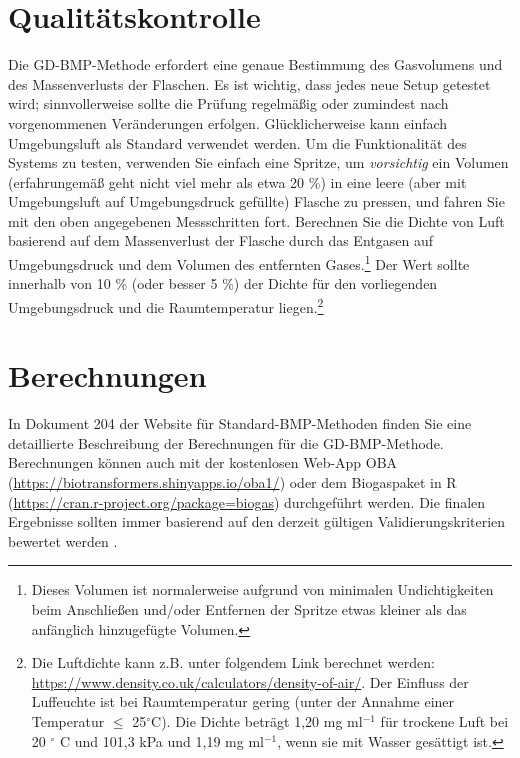 \documentclass[]{article}
\begin{document}
\section{Qualitätskontrolle}
Die GD-BMP-Methode erfordert eine genaue Bestimmung des Gasvolumens und des Massenverlusts der Flaschen.
Es ist wichtig, dass jedes neue Setup getestet wird; sinnvollerweise sollte die Prüfung regelmäßig oder zumindest nach vorgenommenen Veränderungen erfolgen.
Glücklicherweise kann einfach Umgebungsluft als Standard verwendet werden.
Um die Funktionalität des Systems zu testen, verwenden Sie einfach eine Spritze, um \textit{vorsichtig} ein Volumen (erfahrungemäß geht nicht viel mehr als etwa 20 \%) in eine leere (aber mit Umgebungsluft auf Umgebungsdruck gefüllte) Flasche zu pressen, und fahren Sie mit den oben angegebenen Messschritten fort.
Berechnen Sie die Dichte von Luft basierend auf dem Massenverlust der Flasche durch das Entgasen auf Umgebungsdruck und dem Volumen des entfernten Gases.\footnote{Dieses Volumen ist normalerweise aufgrund von minimalen Undichtigkeiten beim Anschließen und/oder Entfernen der Spritze etwas kleiner als das anfänglich hinzugefügte Volumen.}
Der Wert sollte innerhalb von 10 \% (oder besser 5 \%) der Dichte für den vorliegenden Umgebungsdruck und die Raumtemperatur liegen.\footnote{Die Luftdichte kann z.B. unter folgendem Link berechnet werden:  \url{https://www.density.co.uk/calculators/density-of-air/}. Der Einfluss der Luffeuchte ist bei Raumtemperatur gering (unter der Annahme einer Temperatur $\le$ 25$^\circ$C). Die Dichte beträgt 1,20 mg ml$^{-1}$ für trockene Luft bei 20 $^\circ$ C und 101,3 kPa und 1,19 mg ml$^{-1}$, wenn sie mit Wasser gesättigt ist.}

\section{Berechnungen}
In Dokument 204 der Website für Standard-BMP-Methoden \citep{BMPdoc204gasdens} finden Sie eine detaillierte Beschreibung der Berechnungen für die GD-BMP-Methode.
Berechnungen können auch mit der kostenlosen Web-App OBA (\url{https://biotransformers.shinyapps.io/oba1/}) oder dem Biogaspaket in R (\url{https://cran.r-project.org/package=biogas}) \citep{hafnerSoftwareBiogasResearch2018} durchgeführt werden.
Die finalen Ergebnisse sollten immer basierend auf den derzeit gültigen Validierungskriterien bewertet werden \citep{BMPdoc100req}.


\end{document}
